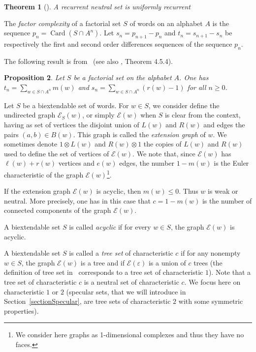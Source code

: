 \documentclass[preprint,12pt]{elsarticle}
\newtheorem{theorem}{Theorem}
\newtheorem{proposition}[theorem]{Proposition}
\newcommand\E{\mathcal{E}}
\DeclareMathOperator{\Card}{Card}
\numberwithin{theorem}{section}
\numberwithin{equation}{section}
\numberwithin{figure}{section}
\numberwithin{table}{section}
\begin{document}
\begin{theorem}[\cite{DolcePerrin2016}]
\label{theo:recurrentur}
A recurrent neutral set is uniformly recurrent
\end{theorem}

The \emph{factor complexity} of a factorial set $S$ of words on an alphabet $A$ is the sequence $p_n=\Card(S\cap A^n)$.
Let $s_n=p_{n+1}-p_n$ and $t_n=s_{n+1}-s_n$ be respectively the first and second order differences sequences of the sequence $p_n$. 

The following result is from~\cite{Cassaigne1997} (see also \cite{BertheRigo2010}, Theorem 4.5.4).

\begin{proposition}
\label{propCANT}
Let $S$ be a factorial set on the alphabet $A$.
One has $t_n = \sum_{w\in S\cap A^n}m(w)$ and $s_n = \sum_{w\in S\cap A^n}(r(w)-1)$ for all $n\ge 0$.
\end{proposition}


Let $S$ be a biextendable set of words.
For $w\in S$, we consider define the undirected graph $\E_S(w)$, or simply $\E(w)$ when $S$ is clear from the context, having as set of vertices the disjoint union of $L(w)$ and $R(w)$ and edges the pairs $(a,b)\in B(w)$.
This graph is called the \emph{extension graph} of $w$.
We sometimes denote $1\otimes L(w)$ and $R(w)\otimes 1$ the copies of $L(w)$ and $R(w)$ used to define the set of vertices of $\E(w)$.
We note that, since $\E(w)$ has $\ell(w)+r(w)$ vertices and $e(w)$ edges, the number $1-m(w)$ is the Euler characteristic of the graph $\E(w)$\footnote{We consider here graphs as 1-dimensional complexes and thus they have no faces.}.

If the extension graph $\E(w)$ is acyclic, then $m(w)\le 0$.
Thus $w$ is weak or neutral.
More precisely, one has in this case that $c=1-m(w)$ is the number of connected components of the graph $\E(w)$.

A biextendable set $S$ is called \emph{acyclic} if for every $w\in S$, the graph $\E(w)$ is acyclic.

A biextendable set $S$ is called a \emph{tree set} of characteristic $c$ if for any nonempty $w \in S$, the graph $\E(w)$ is a tree and if $\E(\varepsilon)$ is a union of $c$ trees (the definition of tree set in~\cite{BertheDeFeliceDolceLeroyPerrinReutenauerRindone2013a} corresponds to a tree set of characteristic $1$).
Note that a tree set of characteristic $c$ is a neutral set of characteristic $c$. We focus here on characteristic $1$ or $2$ (specular sets, that we will introduce in Section~\ref{sectionSpecular}, are tree sets of characteristic $2$ with some symmetric properties).
\end{document}
